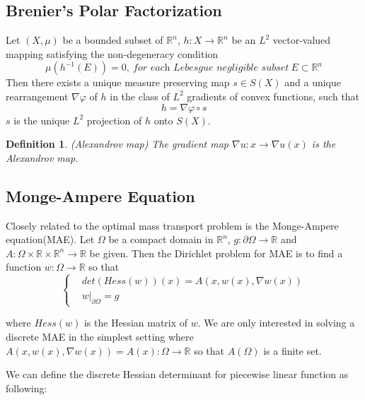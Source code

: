\documentclass[runningheads]{llncs}
\newtheorem{mydef}{Definition}
\begin{document}
\subsection{Brenier's Polar Factorization}

\begin{theorem}
Let $(X,\mu)$ be a bounded subset of $\mathbb{R}^n$, $h:X \to \mathbb{R}^n$ be an $L^2$ vector-valued mapping satisfying the non-degeneracy condition
\[
\mu(h^{-1}(E)) = 0, \ \textit{for each Lebesgue negligible subset}\ E \subset \mathbb{R}^n
\]
Then there exists a unique measure preserving map $s\in S(X)$ and a unique rearrangement $\nabla \varphi $ of $h$ in the class of $L^2$ gradients of convex functions, such that
\[
h = \nabla \varphi \circ s
\]
$s$ is the unique $L^2$ projection of $h$ onto $S(X)$.
\end{theorem}

\begin{mydef}
(Alexandrov map) The gradient map $\nabla u:x\rightarrow\nabla u(x)$ is the Alexandrov map.
\end{mydef}



\subsection{Monge-Ampere Equation}
Closely related to the optimal mass transport problem is the Monge-Ampere equation(MAE). Let $\Omega$ be a compact domain in $\mathbb{R}^n$, $g:\partial \Omega\rightarrow \mathbb{R}$ and $A:\Omega\times \mathbb{R}\times \mathbb{R}^n\rightarrow\mathbb{R}$ be given. Then the Dirichlet problem for MAE is to find a function $w:\Omega\rightarrow\mathbb{R}$ so that
\begin{equation}\label{eqn:mae}
\left\{
\begin{aligned}
  	& det(Hess(w))(x)=A(x,w(x),\nabla w(x)) \\
	& w|_{\partial\Omega}=g
\end{aligned}
\right.
\end{equation}

where $Hess(w)$ is the Hessian matrix of $w$. We are only interested in solving a discrete MAE in the simplest setting where $A(x,w(x),\nabla w(x))=A(x):\Omega\rightarrow\mathbb{R}$ so that $A(\Omega)$ is a finite set. %

We can define the discrete Hessian determinant for piecewise linear function as following:
\end{document}

